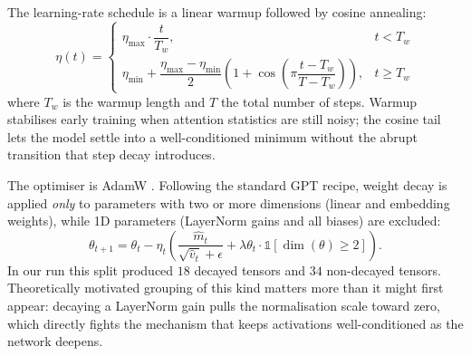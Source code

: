 \noindent The learning-rate schedule is a linear warmup followed by cosine
annealing:
\begin{equation}
\eta(t) =
\begin{cases}
\eta_{\max} \cdot \dfrac{t}{T_w}, & t < T_w \\[0.6em]
\eta_{\min} + \dfrac{\eta_{\max} - \eta_{\min}}{2}
\left(1 + \cos\!\left(\pi \dfrac{t - T_w}{T - T_w}\right)\right), & t \geq T_w
\end{cases}
\label{eq:lr}
\end{equation}
where $T_w$ is the warmup length and $T$ the total number of steps. Warmup
stabilises early training when attention statistics are still noisy; the
cosine tail lets the model settle into a well-conditioned minimum without
the abrupt transition that step decay introduces.

\noindent The optimiser is AdamW \parencite{loshchilov2019decoupled}. Following the
standard GPT recipe, weight decay is applied \emph{only} to parameters
with two or more dimensions (linear and embedding weights), while 1D
parameters (LayerNorm gains and all biases) are excluded:
\begin{equation}
\theta_{t+1} = \theta_t - \eta_t
\left(\frac{\hat{m}_t}{\sqrt{\hat{v}_t} + \epsilon}
+ \lambda \theta_t \cdot \mathbb{1}[\dim(\theta) \geq 2]\right).
\label{eq:adamw}
\end{equation}
In our run this split produced $18$ decayed tensors and $34$ non-decayed
tensors. Theoretically motivated grouping of this kind matters more than
it might first appear: decaying a LayerNorm gain pulls the normalisation
scale toward zero, which directly fights the mechanism that keeps
activations well-conditioned as the network deepens.

